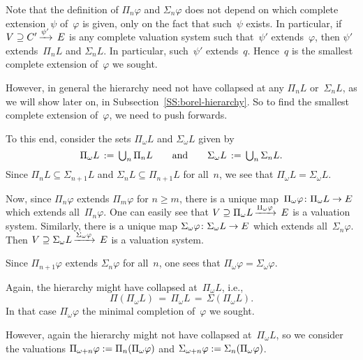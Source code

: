 \documentclass[main.tex]{subfiles}
\begin{document}
Note that the definition of $\Pi_n \varphi$
and $\Sigma_n \varphi$ does not depend
on which complete extension~$\psi$ of~$\varphi$ is given,
only on the fact that such~$\psi$ exists.
In particular,
if $V \supseteq C'\,\smash{\xrightarrow{\psi'}\,E}$ is any complete valuation system
such that~$\psi'$ extends~$\varphi$,
then $\psi'$ extends~$\Pi_n L$ and $\Sigma_n L$.
In particular,
such~$\psi'$ extends~$q$.
Hence~$q$ is the smallest complete extension of~$\varphi$ we sought.

However,
in general the hierarchy need not have collapsed at
any $\Pi_n L$ or~$\Sigma_n L$,
as we will show later on, in Subsection~\ref{SS:borel-hierarchy}.
So to find the smallest complete extension of~$\varphi$,
we need to push forwards.

To this end, consider the sets $\Pi_\omega L$
and $\Sigma_\omega L$ given by
\begin{equation*}
\Pi_\omega L \,:=\,\textstyle{\bigcup_n}\, \Pi_n L
\qquad\text{and}\qquad
\Sigma_\omega L \,:=\, \textstyle{\bigcup_n}\, \Sigma_n L.
\end{equation*}
Since $\Pi_{n} L \subseteq \Sigma_{n+1} L$
and $\Sigma_{n} L \subseteq \Pi_{n+1}L$ for all~$n$,
we see that $\Pi_\omega L = \Sigma_\omega L$.

Now,
since $\Pi_n\varphi$ extends $\Pi_m\varphi$
for $n\geq m$,
there is a unique map~$\Pi_\omega \varphi\colon \Pi_\omega L \rightarrow E$
which extends all~$\Pi_n \varphi$.
One can easily see that $V \supseteq \Pi_\omega L\,\smash{\xrightarrow{\Pi_\omega\varphi}\,E}$
is a valuation system.
Similarly, there is a unique map 
$\Sigma_\omega \varphi \colon \Sigma_\omega L \rightarrow E$
which extends all~$\Sigma_n\varphi$.
Then $V \supseteq \Sigma_\omega L\,\smash{\xrightarrow{\Sigma_\omega\varphi}\,E}$
is a valuation system.

Since $\Pi_{n+1}\varphi$ extends $\Sigma_{n}\varphi$
for all~$n$, one sees that $\Pi_\omega\varphi = \Sigma_\omega\varphi$.

Again, the hierarchy might have collapsed at~$\Pi_\omega L$,
i.e.,
\begin{equation*}
\Pi(\Pi_\omega L ) \,=\, \Pi_\omega L \,=\, \Sigma(\Pi_\omega L).
\end{equation*}
In that case $\Pi_\omega\varphi$ the minimal completion of~$\varphi$
we sought.

However,
again the hierarchy
might not have collapsed at~$\Pi_\omega L$,
so we consider the valuations
 $\Pi_{\omega+n}\varphi:=\Pi_{n} (\Pi_\omega \varphi)$
and $\Sigma_{\omega+n}\varphi := \Sigma_{n}(\Pi_\omega\varphi)$.
\end{document}

